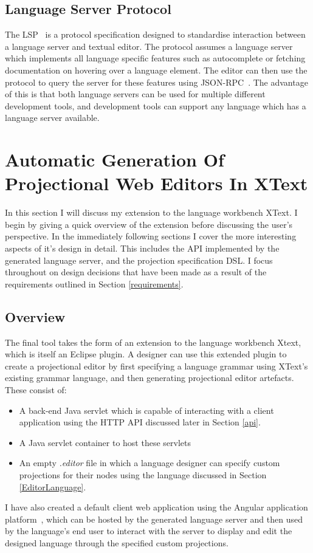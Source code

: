 \documentclass{article}
\begin{document}
\subsection{Language Server Protocol}\label{lsp}
The LSP~\cite{lsp} is a protocol specification designed to standardise interaction between a language server and textual editor. The protocol assumes a language server which implements all language specific features such as autocomplete or fetching documentation on hovering over a language element. The editor can then use the protocol to query the server for these features using JSON-RPC~\cite{jsonrpc}. The advantage of this is that both language servers can be used for multiple different development tools, and development tools can support any language which has a language server available.  
%
%
%
%
%
%
%
\section{Automatic Generation Of Projectional Web Editors In XText}\label{generation}
In this section I will discuss my extension to the language workbench XText. I begin by giving a quick overview of the extension before discussing the user's perspective. In the immediately following sections I cover the more interesting aspects of it's design in detail. This includes the API implemented by the generated language server, and the projection specification DSL. I focus throughout on design decisions that have been made as a result of the requirements outlined in Section \ref{requirements}. 


\subsection{Overview}

The final tool takes the form of an extension to the language workbench Xtext, which is itself an Eclipse plugin. A designer can use this extended plugin to create a projectional editor by first specifying a language grammar using XText's existing grammar language, and then generating projectional editor artefacts. These consist of:
\begin{itemize}
\item A back-end Java servlet which is capable of interacting with a client application using the HTTP API discussed later in Section \ref{api}.
\item A Java servlet container to host these servlets
\item An empty \emph{.editor} file in which a language designer can specify custom projections for their nodes using the language discussed in Section \ref{EditorLanguage}. 
\end{itemize}
%
I have also created a default client web application using the Angular application platform~\cite{angular}, which can be hosted by the generated language server and then used by the language's end user to interact with the server to display and edit the designed language through the specified custom projections. 
\end{document}
